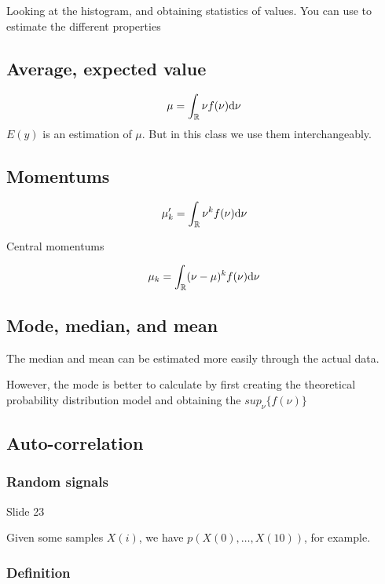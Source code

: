 \documentclass[../main/main.tex]{subfiles}
\begin{document}
Looking at the histogram, and obtaining statistics of values. You can use to estimate the different properties

\subsection{Average, expected value}

\begin{equation}
	\mu = \int_{\mathbb{R}} \nu f(\nu)\dd \nu
\end{equation}
$E(y)$ is an estimation of $\mu$. But in this class we use them interchangeably.

\subsection{Momentums}

\begin{equation}
	\mu_k'  = \int_{\mathbb{R}} \nu^k f(\nu)\dd \nu
\end{equation}

Central momentums

\begin{equation}
	\mu_k = \int_{\mathbb{R}} (\nu - \mu)^k f(\nu)\dd \nu
\end{equation}

\subsection{Mode, median, and mean}

The median and mean can be estimated more easily through the actual data.

However, the mode is better to calculate by first creating the theoretical probability distribution model and obtaining the $sup_\nu \{f(\nu)\}$

\subsection{Auto-correlation}
\subsubsection{Random signals}
Slide 23

Given some samples $X(i)$, we have $p(X(0), \ldots, X(10))$, for example.

\subsubsection{Definition}
\end{document}

